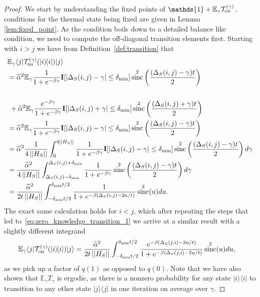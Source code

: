 \documentclass[
 amsmath,amssymb,
 aps,
onecolumn, 
nofootinbib]{revtex4-2}
\newcommand{\on}{\rm on}
\newcommand{\ket}[1]{|#1\rangle}
\newcommand{\bra}[1]{\langle #1|}
\newcommand{\ketbra}[2]{| #1\rangle\! \langle #2|}
\newcommand{\norm}[1]{\left|\left| #1 \right|\right|}
\newcommand{\EE}{\mathbb{E}}
\newcommand{\TT}{\mathcal{T}}
\newcommand{\identity}{\mathds{1}}
\DeclareMathOperator{\sinc}{sinc}
\begin{document}
\begin{proof}
    We start by understanding the fixed points of $\identity + \EE_\gamma \TT_{\on}^{(\gamma)}$, conditions for the thermal state being fixed are given in Lemma \ref{lem:fixed_point}. As the condition boils down to a detailed balance like condition, we need to compute the off-diagonal transition elements first. Starting with $i > j$ we have from Definition~\ref{def:transition} that
    \begin{align}
        &\EE_\gamma \bra{j} \TT_{\on}^{(\gamma)}(\ketbra{i}{i})\ket{j} \nonumber \\
        &=  \widetilde{\alpha}^2 \EE_{\gamma} \frac{1}{1 + e^{-\beta \gamma}} \mathbf{I}[|\Delta_S(i,j) - \gamma| \le \delta_{\min}]  \sinc^2\left(\frac{(\Delta_S(i,j) - \gamma)t}{2}\right) \\ \nonumber \\
        &~+ \widetilde{\alpha}^2 \EE_{\gamma} \frac{e^{-\beta \gamma}}{1 + e^{-\beta \gamma}} \mathbf{I}[|\Delta_S(i,j) + \gamma| \le \delta_{\min}]  \sinc^2\left(\frac{(\Delta_S(i,j) + \gamma)t}{2}\right) \\
        &= \widetilde{\alpha}^2 \EE_{\gamma} \frac{1}{1 + e^{-\beta \gamma}} \mathbf{I}[|\Delta_S(i,j) - \gamma| \le \delta_{\min}]  \sinc^2\left(\frac{(\Delta_S(i,j) - \gamma)t}{2}\right) \\
        &= \widetilde{\alpha}^2 \frac{1}{4 \norm{H_S}} \int_{0}^{4 \norm{H_S}} \frac{1}{1 + e^{-\beta \gamma}} \mathbf{I}[|\Delta_S(i,j) - \gamma| \le \delta_{\min}]  \sinc^2\left(\frac{(\Delta_S(i,j) - \gamma)t}{2}\right) d\gamma \\
        &=  \frac{\widetilde{\alpha}^2}{4 \norm{H_S}} \int_{\Delta_S(i,j) - \delta_{\min}}^{\Delta_S(i,j) + \delta_{\min}} \frac{1}{1 + e^{-\beta \gamma}}  \sinc^2\left(\frac{(\Delta_S(i,j) - \gamma)t}{2}\right) d\gamma \\
        &= \frac{\widetilde{\alpha}^2}{2 t \norm{H_S}} \int_{-\delta_{\min} t /2}^{\delta_{\min} t / 2} \frac{1}{1 + e^{-\beta (\Delta_S(i, j) - 2 u /t)}} \sinc^2(u) du. \label{eq:zero_knowledge_transition_1}
    \end{align}
    The exact same calculation holds for $i < j$, which after repeating the steps that led to~\eqref{eq:zero_knowledge_transition_1} we arrive at a similar result  with a slightly different integrand
    \begin{align}
        \EE_\gamma \bra{j} \TT_{\on}^{(\gamma)}(\ketbra{i}{i})\ket{j} &= \frac{\widetilde{\alpha}^2}{2 t \norm{H_S}} \int_{-\delta_{\min} t /2}^{\delta_{\min} t / 2} \frac{e^{-\beta (\Delta_S(j,i) - 2 u /t)}}{1 + e^{-\beta (\Delta_S(j,i) - 2 u /t)}} \sinc^2(u) du,\label{eq:zero_knowledge_transition_2}
    \end{align}
    as we pick up a factor of $q(1)$ as opposed to $q(0)$. Note that we have also shown that $\EE_\gamma T_\gamma$ is ergodic, as there is a nonzero probability for any state $\ketbra{i}{i}$ to transition to any other state $\ketbra{j}{j}$ in one iteration on average over $\gamma$.


\end{proof}
\end{document}
